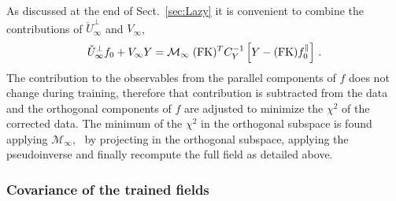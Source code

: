 As discussed at the end of Sect.~\ref{sec:Lazy} it is convenient to 
combine the contributions of $\check{U}^\perp_{\infty}$ and $V_{\infty}$,
\begin{align}
    \label{eq:DataCorrectedInferenceAtInfty}
    \check{U}^{\perp}_{\infty} f_{0} + V_{\infty} Y 
        = \mathcal{M}_{\infty}\; (\mathrm{FK})^T C_Y^{-1} \left[Y - (\mathrm{FK}) f_{0}^{\parallel}\right]\, .
\end{align}
The contribution to the observables from the parallel components of $f$ does not change during training, 
therefore that contribution is subtracted from the data and the orthogonal components of $f$ are adjusted to 
minimize the $\chi^2$ of the corrected data. The minimum of the $\chi^2$ in the orthogonal subspace is found
applying $\mathcal{M}_{\infty}$, \ie\ by projecting in the orthogonal subspace, applying the pseudoinverse and 
finally recompute the full field as detailed above. 

\subsubsection{Covariance of the trained fields}
\label{sec:Covariance}

